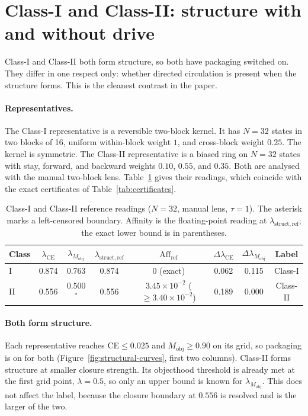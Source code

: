 \section{Class-I and Class-II: structure with and without drive}
\label{sec:class-i-ii}

Class-I and Class-II both form structure, so both have packaging switched on. They differ in one respect only: whether directed circulation is present when the structure forms. This is the cleanest contrast in the paper.

\paragraph{Representatives.} The Class-I representative is a reversible two-block kernel. It has $N=32$ states in two blocks of 16, uniform within-block weight $1$, and cross-block weight $0.25$. The kernel is symmetric. The Class-II representative is a biased ring on $N=32$ states with stay, forward, and backward weights $0.10$, $0.55$, and $0.35$. Both are analysed with the manual two-block lens. Table~\ref{tab:class-i-ii-summary} gives their readings, which coincide with the exact certificates of Table~\ref{tab:certificates}.

\begin{table}[tbp]
\centering
\small
\caption{Class-I and Class-II reference readings ($N=32$, manual lens, $\tau=1$). The asterisk marks a left-censored boundary. Affinity is the floating-point reading at $\lambda_{\mathrm{struct,ref}}$; the exact lower bound is in parentheses.}
\label{tab:class-i-ii-summary}
\setlength{\tabcolsep}{4pt}
\begin{tabular}{@{}lccccccc@{}}
\toprule
Class & $\lambda_{\mathrm{CE}}$ & $\lambda_{M_{\mathrm{obj}}}$ & $\lambda_{\mathrm{struct,ref}}$ & $\mathrm{Aff}_{\mathrm{ref}}$ & $\Delta\lambda_{\mathrm{CE}}$ & $\Delta\lambda_{M_{\mathrm{obj}}}$ & Label \\
\midrule
I  & 0.874 & 0.763 & 0.874 & $0$ (exact) & 0.062 & 0.115 & Class-I \\
II & 0.556 & 0.500$^{*}$ & 0.556 & $3.45\times10^{-2}$ ($\ge 3.40\times10^{-2}$) & 0.189 & 0.000 & Class-II \\
\bottomrule
\end{tabular}
\end{table}

\paragraph{Both form structure.} Each representative reaches CE${}\le0.025$ and $M_{\mathrm{obj}}\ge0.90$ on its grid, so packaging is on for both (Figure~\ref{fig:structural-curves}, first two columns). Class-II forms structure at smaller closure strength. Its objecthood threshold is already met at the first grid point, $\lambda=0.5$, so only an upper bound is known for $\lambda_{M_{\mathrm{obj}}}$. This does not affect the label, because the closure boundary at $0.556$ is resolved and is the larger of the two.

